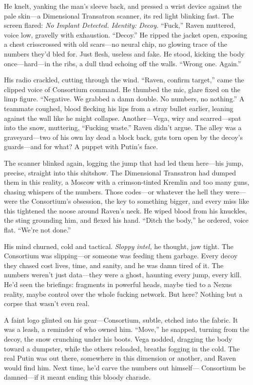 \documentclass[12pt]{book}
\begin{document}
He knelt, yanking the man’s sleeve back, and pressed a wrist device against the pale skin—a Dimensional Transatron scanner, its red light blinking fast. The screen flared: \textit{No Implant Detected. Identity: Decoy.} “Fuck,” Raven muttered, voice low, gravelly with exhaustion. “Decoy.” He ripped the jacket open, exposing a chest crisscrossed with old scars—no neural chip, no glowing trace of the numbers they’d bled for. Just flesh, useless and fake. He stood, kicking the body once—hard—in the ribs, a dull thud echoing off the walls. “Wrong one. Again.”

His radio crackled, cutting through the wind. “Raven, confirm target,” came the clipped voice of Consortium command. He thumbed the mic, glare fixed on the limp figure. “Negative. We grabbed a damn double. No numbers, no nothing.” A teammate coughed, blood flecking his lips from a stray bullet earlier, leaning against the wall like he might collapse. Another—Vega, wiry and scarred—spat into the snow, muttering, “Fucking waste.” Raven didn’t argue. The alley was a graveyard—two of his own lay dead a block back, guts torn open by the decoy’s guards—and for what? A puppet with Putin’s face.

The scanner blinked again, logging the jump that had led them here—his jump, precise, straight into this shitshow. The Dimensional Transatron had dumped them in this reality, a Moscow with a crimson-tinted Kremlin and too many guns, chasing whispers of the numbers. Those codes—or whatever the hell they were—were the Consortium’s obsession, the key to something bigger, and every miss like this tightened the noose around Raven’s neck. He wiped blood from his knuckles, the sting grounding him, and flexed his hand. “Ditch the body,” he ordered, voice flat. “We’re not done.”

His mind churned, cold and tactical. \textit{Sloppy intel,} he thought, jaw tight. The Consortium was slipping—or someone was feeding them garbage. Every decoy they chased cost lives, time, and sanity, and he was damn tired of it. The numbers weren’t just data—they were a ghost, haunting every jump, every kill. He’d seen the briefings: fragments in powerful heads, maybe tied to a Nexus reality, maybe control over the whole fucking network. But here? Nothing but a corpse that wasn’t even real.

A faint logo glinted on his gear—Consortium, subtle, etched into the fabric. It was a leash, a reminder of who owned him. “Move,” he snapped, turning from the decoy, the snow crunching under his boots. Vega nodded, dragging the body toward a dumpster, while the others reloaded, breaths fogging in the cold. The real Putin was out there, somewhere in this dimension or another, and Raven would find him. Next time, he’d carve the numbers out himself— Consortium be damned—if it meant ending this bloody charade.
\end{document}
